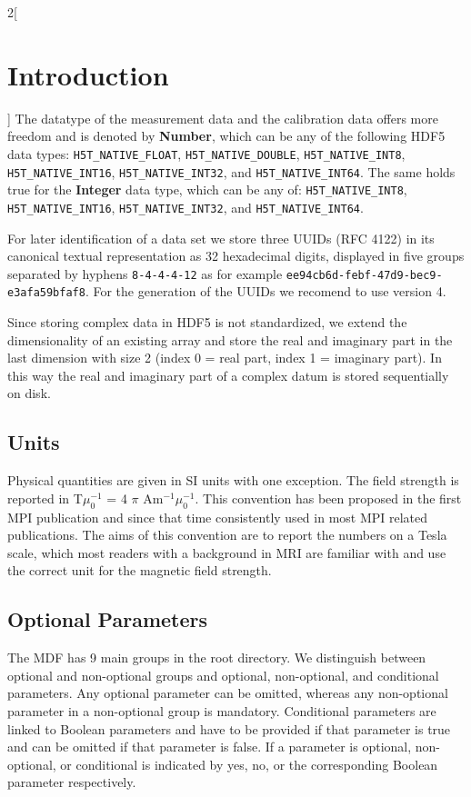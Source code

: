 \documentclass[landscape,a4paper]{article} %
\newcommand{\inl}[1]{\lstinline[columns=fixed]{#1}}
\newcommand{\inltab}[1]{{\ttfamily\bfseries\color{blue}#1}}
\begin{document}
\begin{multicols}{2}[\section{Introduction} \label{Sec:Introduction}]
The datatype of the measurement data and the calibration data offers more freedom and is denoted by \inltab{Number}, which can be any of the following HDF5 data types: \inl{H5T_NATIVE_FLOAT}, \inl{H5T_NATIVE_DOUBLE}, \inl{H5T_NATIVE_INT8}, \inl{H5T_NATIVE_INT16}, \inl{H5T_NATIVE_INT32}, and \inl{H5T_NATIVE_INT64}. The same holds true for the \inltab{Integer} data type, which can be any of: \inl{H5T_NATIVE_INT8}, \inl{H5T_NATIVE_INT16}, \inl{H5T_NATIVE_INT32}, and \inl{H5T_NATIVE_INT64}. 

For later identification of a data set we store three UUIDs (RFC 4122) \cite{leach2005universally} in its canonical textual representation as 32 hexadecimal digits, displayed in five groups separated by hyphens \inl{8-4-4-4-12} as for example \inl{ee94cb6d-febf-47d9-bec9-e3afa59bfaf8}. For the generation of the UUIDs we recomend to use version 4.

Since storing complex data in HDF5 is not standardized, we extend the dimensionality of an existing array and store the real and imaginary part in the last dimension with size 2 (index 0 = real part, index 1 = imaginary part). In this way the real and imaginary part of a complex datum is stored sequentially on disk.

\subsection{Units}

Physical quantities are given in SI units with one exception. The field strength is reported in T$\mu_0^{-1}$ = 4 $\pi$ Am$^{-1}\mu_0^{-1}$. This convention has been proposed in the first MPI publication \cite{Gleich2005} and since that time consistently used in most MPI related publications. The aims of this convention are to report the numbers on a Tesla scale, which most readers with a background in MRI are familiar with and use the correct unit for the magnetic field strength.

\subsection{Optional Parameters}

The MDF has 9 main groups in the root directory. We distinguish between optional and non-optional groups and optional, non-optional, and conditional parameters. Any optional parameter can be omitted, whereas any non-optional parameter in a non-optional group is mandatory. Conditional parameters are linked to Boolean parameters and have to be provided if that parameter is true and can be omitted if that parameter is false. If a parameter is optional, non-optional, or conditional is indicated by yes, no, or the corresponding Boolean parameter respectively.


\end{multicols}
\end{document}
